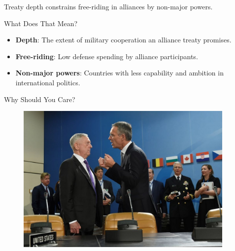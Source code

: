 \documentclass[12pt]{beamer}
\begin{document}
 \begin{frame}[standout]

Treaty depth constrains free-riding in alliances by non-major powers.  

 \end{frame}
 
 
 \begin{frame}{What Does That Mean?} 

\begin{itemize}
\item \textbf{Depth}: The extent of military cooperation an alliance treaty promises.
\pause  
\item \textbf{Free-riding}: Low defense spending by alliance participants. 
\pause 
\item \textbf{Non-major powers}: Countries with less capability and ambition in international politics. 
\end{itemize}

 \end{frame}




\begin{frame}{Why Should You Care?}

\begin{figure}[htbp]
	\centering
		\includegraphics[width=0.95\textwidth]{mattis-nato.jpg}
	\label{fig:mattis-nato}
\end{figure}


\end{frame}
\end{document}
